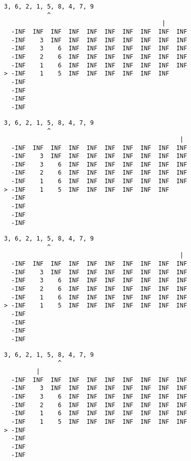 { \begin{verbatim}
3, 6, 2, 1, 5, 8, 4, 7, 9
            ^
                                            |
  -INF  INF  INF  INF  INF  INF  INF  INF  INF  INF
  -INF    3  INF  INF  INF  INF  INF  INF  INF  INF
  -INF    3    6  INF  INF  INF  INF  INF  INF  INF
  -INF    2    6  INF  INF  INF  INF  INF  INF  INF
  -INF    1    6  INF  INF  INF  INF  INF  INF  INF
> -INF    1    5  INF  INF  INF  INF  INF  INF     
  -INF                                             
  -INF                                             
  -INF                                             
  -INF                                             
\end{verbatim} }

{ \begin{verbatim}
3, 6, 2, 1, 5, 8, 4, 7, 9
            ^
                                                 |
  -INF  INF  INF  INF  INF  INF  INF  INF  INF  INF
  -INF    3  INF  INF  INF  INF  INF  INF  INF  INF
  -INF    3    6  INF  INF  INF  INF  INF  INF  INF
  -INF    2    6  INF  INF  INF  INF  INF  INF  INF
  -INF    1    6  INF  INF  INF  INF  INF  INF  INF
> -INF    1    5  INF  INF  INF  INF  INF  INF     
  -INF                                             
  -INF                                             
  -INF                                             
  -INF                                             
\end{verbatim} }

{ \begin{verbatim}
3, 6, 2, 1, 5, 8, 4, 7, 9
            ^
                                                 |
  -INF  INF  INF  INF  INF  INF  INF  INF  INF  INF
  -INF    3  INF  INF  INF  INF  INF  INF  INF  INF
  -INF    3    6  INF  INF  INF  INF  INF  INF  INF
  -INF    2    6  INF  INF  INF  INF  INF  INF  INF
  -INF    1    6  INF  INF  INF  INF  INF  INF  INF
> -INF    1    5  INF  INF  INF  INF  INF  INF  INF
  -INF                                             
  -INF                                             
  -INF                                             
  -INF                                             
\end{verbatim} }

{ \begin{verbatim}
3, 6, 2, 1, 5, 8, 4, 7, 9
               ^
         |
  -INF  INF  INF  INF  INF  INF  INF  INF  INF  INF
  -INF    3  INF  INF  INF  INF  INF  INF  INF  INF
  -INF    3    6  INF  INF  INF  INF  INF  INF  INF
  -INF    2    6  INF  INF  INF  INF  INF  INF  INF
  -INF    1    6  INF  INF  INF  INF  INF  INF  INF
  -INF    1    5  INF  INF  INF  INF  INF  INF  INF
> -INF                                             
  -INF                                             
  -INF                                             
  -INF                                             
\end{verbatim} }

